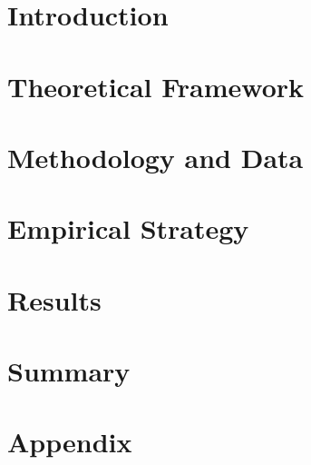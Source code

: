 \documentclass{article}
\begin{document}


\section{Introduction}



\section{Theoretical Framework}



\section{Methodology and Data}



\section{Empirical Strategy}



\section{Results}



\section{Summary}



\printbibliography


\section{Appendix}


\end{document}
